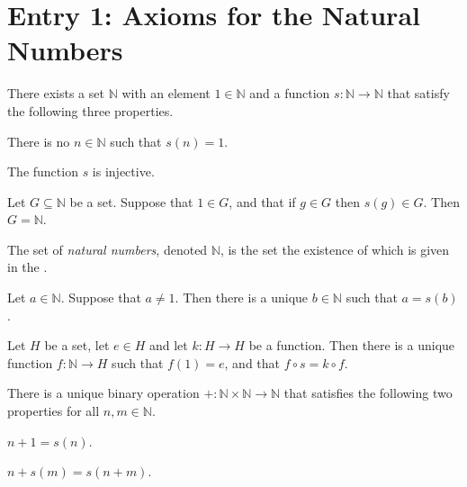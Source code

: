 \section{Entry 1: Axioms for the Natural Numbers}
\label{nat}

\begin{axiom} %
	\label{nat:a:peano}
	There exists a set $\mathbb{N}$ with an element $1 \in \mathbb{N}$ and a function $s : \mathbb{N} \to \mathbb{N}$ that satisfy the following three properties.
	\begin{lenumerate}
		\item \label{nat:a:peano:1}
		There is no $n \in \mathbb{N}$ such that $s(n) = 1$.
		\item \label{nat:a:peano:injective}
		The function $s$ is injective.
		\item \label{nat:a:peano:induction}
		Let $G \subseteq \mathbb{N}$ be a set. Suppose that $1 \in G$, and that if $g \in G$ then $s(g) \in G$. Then
		$G = \mathbb{N}$.
	\end{lenumerate}
\end{axiom}

\begin{definition} %
	\label{nat:d:natural}
	The set of \emph{natural numbers}, denoted $\mathbb{N}$, is the set the existence of which is given in the .
\end{definition}

\begin{lemma} %
	\label{nat:l:exists_prev}
	Let $a \in \mathbb{N}$. Suppose that $a \not= 1$. Then there is a unique $b \in \mathbb{N}$ such that $a = s(b)$.
\end{lemma}

\begin{theorem} %
	\label{nat:t:recusion}
	Let $H$ be a set, let $e \in H$ and let $k : H \to H$ be a function. Then there is a unique function $f : \mathbb{N} \to H$ such that $f(1) = e$, and that $f \circ s = k \circ f$.
\end{theorem}

\begin{theorem} %
	\label{nat:t:add}
	There is a unique binary operation $+ : \mathbb{N} \times \mathbb{N} \to \mathbb{N}$ that satisfies the following two properties for all $n, m \in \mathbb{N}$.
	\begin{lenumerate}
		\item \label{nat:t:add:1}
		$n + 1 = s(n)$.
		\item \label{nat:t:add:n}
		$n + s(m) = s(n + m)$.
	\end{lenumerate}
\end{theorem}

